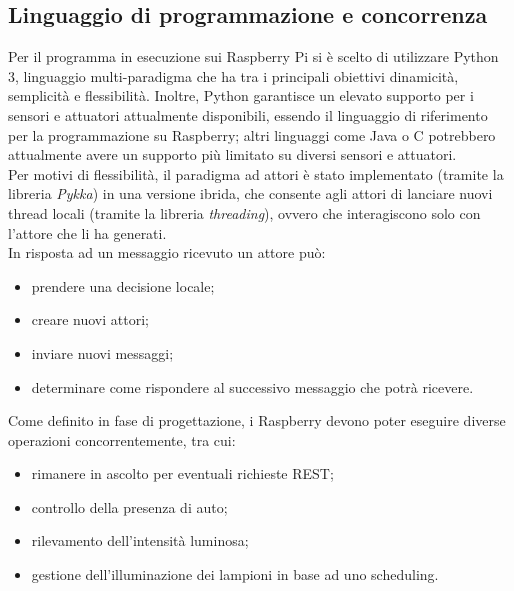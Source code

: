 \subsection{Linguaggio di programmazione e concorrenza}
Per il programma in esecuzione sui Raspberry Pi si è scelto di utilizzare Python 3, linguaggio multi-paradigma che ha tra i principali obiettivi dinamicità, semplicità e flessibilità.
Inoltre, Python garantisce un elevato supporto per i sensori e attuatori attualmente disponibili, essendo il linguaggio di riferimento per la programmazione su Raspberry; altri linguaggi come Java o C potrebbero attualmente avere un supporto più limitato su diversi sensori e attuatori.
\\Per motivi di flessibilità, il paradigma ad attori è stato implementato (tramite la libreria \textit{Pykka}) in una versione ibrida, che consente agli attori di lanciare nuovi thread locali (tramite la libreria \textit{threading}), ovvero che interagiscono solo con l'attore che li ha generati.
\\In risposta ad un messaggio ricevuto un attore può:
\begin{itemize}
 \item prendere una decisione locale;
 \item creare nuovi attori;
 \item inviare nuovi messaggi;
 \item determinare come rispondere al successivo messaggio che potrà ricevere.
\end{itemize}
Come definito in fase di progettazione, i Raspberry devono poter eseguire diverse operazioni concorrentemente, tra cui:
\begin{itemize}
 \item rimanere in ascolto per eventuali richieste REST;
 \item controllo della presenza di auto;
 \item rilevamento dell'intensità luminosa;
 \item gestione dell'illuminazione dei lampioni in base ad uno scheduling.
\end{itemize}

